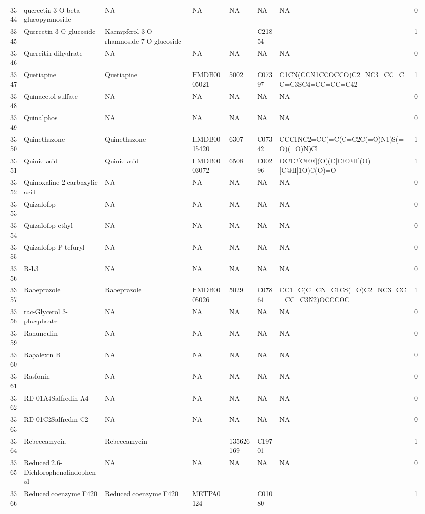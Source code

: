 \documentclass[a4paper]{article}
\begin{document}
\begin{longtable}{rlllllll}
  3344 & quercetin-3-O-beta-glucopyranoside & NA & NA & NA & NA & NA & 0 \\ 
  3345 & Quercetin-3-O-glucoside & Kaempferol 3-O-rhamnoside-7-O-glucoside &  &  & C21854 &  & 1 \\ 
  3346 & Quercitin dihydrate & NA & NA & NA & NA & NA & 0 \\ 
  3347 & Quetiapine & Quetiapine & HMDB0005021 & 5002 & C07397 & C1CN(CCN1CCOCCO)C2=NC3=CC=CC=C3SC4=CC=CC=C42 & 1 \\ 
  3348 & Quinacetol sulfate & NA & NA & NA & NA & NA & 0 \\ 
  3349 & Quinalphos & NA & NA & NA & NA & NA & 0 \\ 
  3350 & Quinethazone & Quinethazone & HMDB0015420 & 6307 & C07342 & CCC1NC2=CC(=C(C=C2C(=O)N1)S(=O)(=O)N)Cl & 1 \\ 
  3351 & Quinic acid & Quinic acid & HMDB0003072 & 6508 & C00296 & OC1C[C@@](O)(C[C@@H](O)[C@H]1O)C(O)=O & 1 \\ 
  3352 & Quinoxaline-2-carboxylic acid & NA & NA & NA & NA & NA & 0 \\ 
  3353 & Quizalofop & NA & NA & NA & NA & NA & 0 \\ 
  3354 & Quizalofop-ethyl & NA & NA & NA & NA & NA & 0 \\ 
  3355 & Quizalofop-P-tefuryl & NA & NA & NA & NA & NA & 0 \\ 
  3356 & R-L3 & NA & NA & NA & NA & NA & 0 \\ 
  3357 & Rabeprazole & Rabeprazole & HMDB0005026 & 5029 & C07864 & CC1=C(C=CN=C1CS(=O)C2=NC3=CC=CC=C3N2)OCCCOC & 1 \\ 
  3358 & rac-Glycerol 3-phosphoate & NA & NA & NA & NA & NA & 0 \\ 
  3359 & Ranunculin & NA & NA & NA & NA & NA & 0 \\ 
  3360 & Rapalexin B & NA & NA & NA & NA & NA & 0 \\ 
  3361 & Rasfonin & NA & NA & NA & NA & NA & 0 \\ 
  3362 & RD 01A4Salfredin A4 & NA & NA & NA & NA & NA & 0 \\ 
  3363 & RD 01C2Salfredin C2 & NA & NA & NA & NA & NA & 0 \\ 
  3364 & Rebeccamycin & Rebeccamycin &  & 135626169 & C19701 &  & 1 \\ 
  3365 & Reduced 2,6-Dichlorophenolindophenol & NA & NA & NA & NA & NA & 0 \\ 
  3366 & Reduced coenzyme F420 & Reduced coenzyme F420 & METPA0124 &  & C01080 &  & 1 \\ 

\end{longtable}
\end{document}
